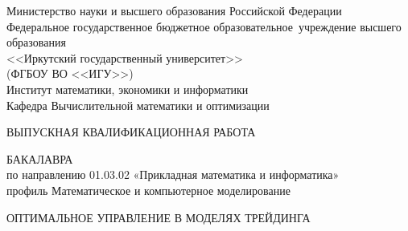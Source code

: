 
\singlespacing
\begin{titlepage}
\begin{center}
Министерство науки и высшего образования Российской Федерации\\

	Федеральное государственное бюджетное образовательное\
учреждение высшего образования\\
	
<<Иркутский государственный университет>>\\

	(ФГБОУ ВО <<ИГУ>>)\\
	
Институт математики, экономики и информатики\\

	Кафедра Вычислительной математики и оптимизации\\

\end{center}


\vspace{2.7cm}


\begin{center}
	
{\bf 
		
ВЫПУСКНАЯ КВАЛИФИКАЦИОННАЯ РАБОТА
		
БАКАЛАВРА\\[1mm]

по направлению 01.03.02 «Прикладная математика и информатика»\\[1mm]
	
профиль  Математическое и компьютерное моделирование 	
}  
	
	\vspace{0.9cm}
	
{
		
ОПТИМАЛЬНОЕ УПРАВЛЕНИЕ В МОДЕЛЯХ ТРЕЙДИНГА
} %

\end{center}


 
 

\end{titlepage}
